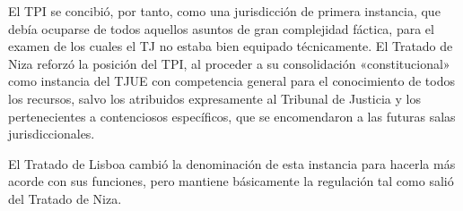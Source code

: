 \documentclass[10pt,a4paper]{article}
\begin{document}
El TPI se concibió, por tanto, como una jurisdicción de primera instancia, que debía ocuparse de todos aquellos asuntos de gran complejidad fáctica, para el examen de los cuales el TJ no estaba bien equipado técnicamente. El Tratado de Niza reforzó la posición del TPI, al proceder a su consolidación «constitucional» como instancia del TJUE con competencia general para el conocimiento de todos los recursos, salvo los atribuidos expresamente al Tribunal de Justicia y los pertenecientes a contenciosos específicos, que se encomendaron a las futuras salas jurisdiccionales.

El Tratado de Lisboa cambió la denominación de esta instancia para hacerla más acorde con sus funciones, pero mantiene básicamente la regulación tal como salió del Tratado de Niza.
\end{document}
